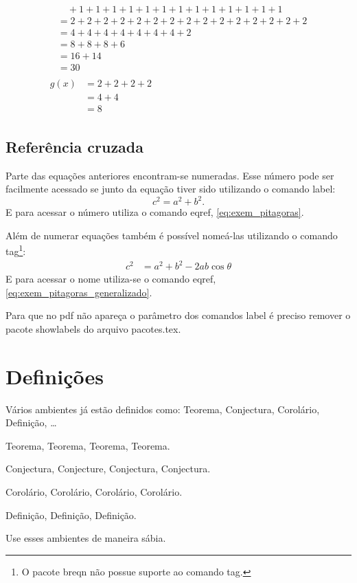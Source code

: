 \begin{description}
\begin{align}
\begin{split}
        &\quad {}+ 1 + 1 + 1 + 1 + 1 + 1 + 1 + 1 + 1 + 1 + 1 + 1 + 1 \\
        &= 2 + 2 + 2 + 2 + 2 + 2 + 2 + 2 + 2 + 2 + 2 + 2 + 2 + 2 + 2 \\
        &= 4 + 4 + 4 + 4 + 4 + 4 + 4 + 2 \\
        &= 8 + 8 + 8 + 6 \\
        &= 16 + 14 \\
        &= 30
      \end{split} \\
      \begin{split}
        g(x) &= 2 + 2 + 2 + 2 \\
        &= 4 + 4 \\
        &= 8
      \end{split}
    \end{align}
\end{description}

\subsection{Referência cruzada}
Parte das equações anteriores encontram-se numeradas. Esse número pode ser
facilmente acessado se junto da equação tiver sido utilizando o comando label:
\begin{dmath}
  c^2 = a^2 + b^2. \label{eq:exem_pitagoras}
\end{dmath}
E para acessar o número utiliza o comando eqref, \eqref{eq:exem_pitagoras}.

Além de numerar equações também é possível nomeá-las utilizando o comando
tag\footnote{O pacote breqn não possue suporte ao comando tag.}:
\begin{align}
  c^2 &= a^2 + b^2 - 2 a b \cos\theta 
  \label{eq:exem_pitagoras_generalizado}
  \tag{GTP}
\end{align}
E para acessar o nome utiliza-se o comando eqref,
\eqref{eq:exem_pitagoras_generalizado}.

Para que no pdf não apareça o parâmetro dos comandos label é preciso remover o
pacote showlabels do arquivo pacotes.tex.

\section{Definições}
Vários ambientes já estão definidos como: Teorema, Conjectura, Corolário,
Definição, \ldots

\begin{thm}
  Teorema, Teorema, Teorema, Teorema.
\end{thm}

\begin{con}
  Conjectura, Conjecture, Conjectura, Conjectura.
\end{con}

\begin{cor}
  Corolário, Corolário, Corolário, Corolário.
\end{cor}

\begin{dfn}
  Definição, Definição, Definição.
\end{dfn}

Use esses ambientes de maneira sábia.
